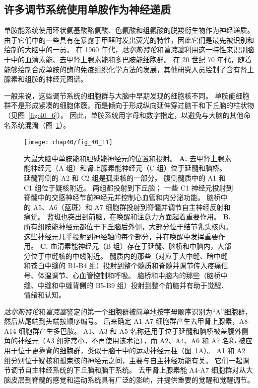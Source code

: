 \subsection{许多调节系统使用单胺作为神经递质}

单胺能系统使用环状氨基酸酪氨酸、色氨酸和组氨酸的脱羧衍生物作为神经递质。
由于它们中的一些具有在暴露于甲醛时发出荧光的特性，因此它们是最先被识别和绘制的大脑中的一员。
在 1960 年代，\textit{达尔斯特伦}和\textit{富克塞}利用这一特性来识别脑干中的血清素能、去甲肾上腺素能和多巴胺能细胞群。
在 20 世纪 70 年代，随着能够绘制合成单胺的酶的免疫组织化学方法的发展，其他研究人员绘制了含有肾上腺素和组胺的神经元图谱。


一般来说，这些调节系统的细胞群与大脑中早期发现的细胞核不同。
单胺能细胞群不是形成紧凑的细胞体簇，而是倾向于形成纵向延伸穿过脑干和下丘脑的柱状物（见图~\ref{fig:40_6}）。
因此，单胺系统用字母和数字指定，以避免与大脑的其他命名系统混淆（图~\ref{fig:40_11}）。


\begin{figure}[htbp]
	\centering
	\texttt{[image: chap40/fig\_40\_11]}
	\caption{大鼠大脑中单胺能和胆碱能神经元的位置和投射。
		\textbf{A.} 去甲肾上腺素能神经元（A 组）和肾上腺素能神经元（C 组）位于延髓和脑桥。
		延髓背侧的 A2 和 C2 组是孤束核的一部分。
		腹侧髓质中的 A1 和 C1 组位于疑核附近。
		两组都投射到下丘脑；
		一些 C1 神经元投射到脊髓中的交感神经节前神经元并控制心血管和内分泌功能。
		脑桥中的 A5、A6（蓝斑）和 A7 细胞群投射到脊髓并调节自主神经反射和痛觉。
		蓝斑也突出到前脑，在唤醒和注意力方面起着重要作用。
		\textbf{B.} 所有组胺能神经元都位于下丘脑后外侧，大部分位于结节乳头核内。
		这些神经元几乎投射到神经轴的每个部分，并在唤醒中发挥重要作用。
		\textbf{C.} 血清素能神经元（B 组）存在于延髓、脑桥和中脑内，大部分位于中缝核的中线附近。
		髓质内的那些（对应于大中缝、暗中缝和苍白中缝的 B1-B4 组）投射到整个髓质和脊髓并调节传入疼痛信号、体温调节、心血管控制和呼吸。
		脑桥和中脑内的那些（脑桥中缝、中缝和中缝背侧的 B5-B9 组）投射到整个前脑并有助于觉醒、情绪和认知。}
	\label{fig:40_11}
\end{figure}


\textit{达尔斯特伦}和\textit{富克塞}鉴定的第一个细胞群被简单地按字母顺序识别为“A”细胞群，然后从尾端到头端按顺序编号。
后来确定 A1-A7 细胞群产生去甲肾上腺素，A8-A14 细胞群产生多巴胺。
A1、A3 和 A5 名称适用于位于延髓和脑桥被盖腹外侧角的神经元（A3 组非常小，不再使用该术语），而 A2、A4、A6 和 A7 名称 被应用于位于更靠背的细胞群，类似于脑干中的运动神经元柱（图~\ref{fig:40_11}A）。
A1 和 A2 组分别位于疑核和孤束核的神经元之间，主要与自主神经功能有关。
它们一起调节调节自主神经系统的下丘脑和脑干系统。
去甲肾上腺素能 A4-A7 细胞群对从大脑皮层到脊髓的感觉和运动系统具有广泛的影响，并提供重要的觉醒和觉醒调节。


